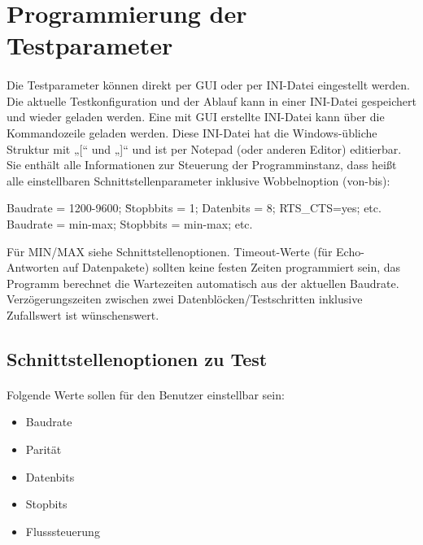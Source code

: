 \section{Programmierung der Testparameter}
\paragraph{}
Die Testparameter können direkt per GUI oder per INI-Datei eingestellt werden. Die aktuelle Testkonfiguration und der Ablauf kann in einer INI-Datei gespeichert und wieder geladen werden. Eine mit GUI erstellte INI-Datei kann über die Kommandozeile geladen werden. Diese INI-Datei hat die Windows-übliche Struktur mit „[“ und „]“ und ist per Notepad (oder anderen Editor) editierbar.
\\
Sie enthält alle Informationen zur Steuerung der Programminstanz, dass heißt alle einstellbaren Schnittstellenparameter inklusive Wobbelnoption (von-bis):
\begin{tabbing}
\hspace*{10mm}Baudrate = 1200-9600; \=Stopbbits = 1; Datenbits = 8; RTS\_CTS=yes; etc.
\\
\hspace*{10mm}Baudrate = min-max; \>Stopbbits = min-max; etc.
\end{tabbing}

Für MIN/MAX siehe Schnittstellenoptionen. Timeout-Werte (für Echo-Antworten auf Datenpakete) sollten keine festen Zeiten programmiert sein, das Programm  berechnet die Wartezeiten automatisch aus der aktuellen Baudrate. Verzögerungszeiten zwischen zwei Datenblöcken/Testschritten inklusive Zufallswert ist wünschenswert.


\subsection{Schnittstellenoptionen zu Test}
\paragraph{}
Folgende Werte sollen für den Benutzer einstellbar sein:

\begin{itemize}
\item Baudrate
\item Parität
\item Datenbits
\item Stopbits
\item Flusssteuerung
\end{itemize}

